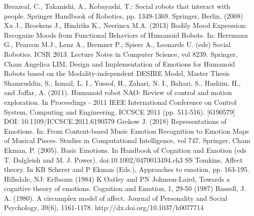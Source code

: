 \documentclass[runningheads]{llncs}
\begin{document}
\begin{thebibliography}{8}
Breazeal, C., Takanishi, A., Kobayashi, T.: Social robots that interact with people. Springer Handbook of Robotics, pp. 1349-1369. Springer, Berlin, (2008)
Xu J., Broekens J., Hindriks K., Neerincx M.A. (2013) Bodily Mood Expression: Recognize Moods from Functional Behaviors of Humanoid Robots. In: Herrmann G., Pearson M.J., Lenz A., Bremner P., Spiers A., Leonards U. (eds) Social Robotics. ICSR 2013. Lecture Notes in Computer Science, vol 8239. Springer, Cham 
Angelica LIM, Design and Implementation of Emotions for Humanoid Robots based on the Modality-independent DESIRE Model, Master Thesis
Shamsuddin, S., Ismail, L. I., Yussof, H., Zahari, N. I., Bahari, S., Hashim, H., and Jaffar, A. (2011). Humanoid robot NAO: Review of control and motion exploration. In Proceedings - 2011 IEEE International Conference on Control System, Computing and Engineering, ICCSCE 2011 (pp. 511-516). [6190579] DOI: 10.1109/ICCSCE.2011.6190579
Grekow J. (2018) Representations of Emotions. In: From Content-based Music Emotion Recognition to Emotion Maps of Musical Pieces. Studies in Computational Intelligence, vol 747. Springer, Cham
Ekman, P. (2005). Basic Emotions. In Handbook of Cognition and Emotion (eds T. Dalgleish and M. J. Power). doi:10.1002/0470013494.ch3
SS Tomkins, Affect theory. In KR Scherer and P Ekman (Eds.), Approaches to
emotion, pp. 163-195. Hillsdale, NJ: Erlbaum (1984)
K Oatley and PN Johnson-Laird, Towards a cognitive theory of emotions. Cognition and Emotion, 1, 29-50 (1987)
Russell, J. A. (1980). A circumplex model of affect. Journal of Personality and Social Psychology, 39(6), 1161-1178. http://dx.doi.org/10.1037/h0077714

\end{thebibliography}
\end{document}
